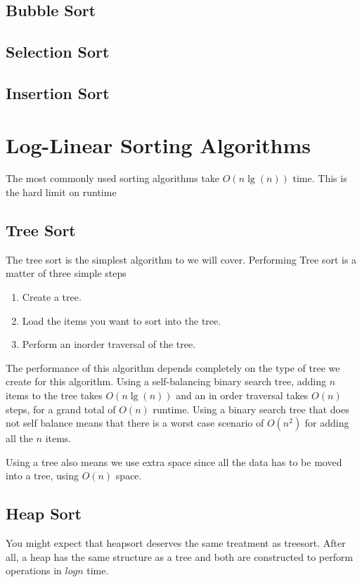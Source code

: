 \documentclass[10pt,a4paper]{book}
\begin{document}
\subsection{Bubble Sort}

\subsection{Selection Sort}

\subsection{Insertion Sort}


\section{Log-Linear Sorting Algorithms}
The most commonly used sorting algorithms take $ O(n \lg(n)) $ time.
This is the hard limit on runtime %
\subsection{Tree Sort}
The tree sort is the simplest algorithm to we will cover. Performing Tree sort is a matter of three simple steps

\begin{enumerate}
	\item Create a tree.
	\item Load the items you want to sort into the tree.
	\item Perform an inorder traversal of the tree.
\end{enumerate}


The performance of this algorithm depends completely on the type of tree we create for this algorithm.  Using a self-balancing binary search tree, adding $ n $ items to the tree takes $ O(n\lg(n)) $ and an in order traversal takes $ O(n) $ steps, for a grand total of $ O(n) $ runtime.  Using a binary search tree that does not self balance means that there is a worst case scenario of $ O(n^{2}) $ for adding all the $ n $ items.

Using a tree also means we use extra space since all the data has to be moved into a tree, using $ O(n) $ space.
\subsection{Heap Sort}
You might expect that heapsort deserves the same treatment as treesort.
After all, a heap has the same structure as a tree and both are constructed to perform operations in $log n $ time.
\end{document}
